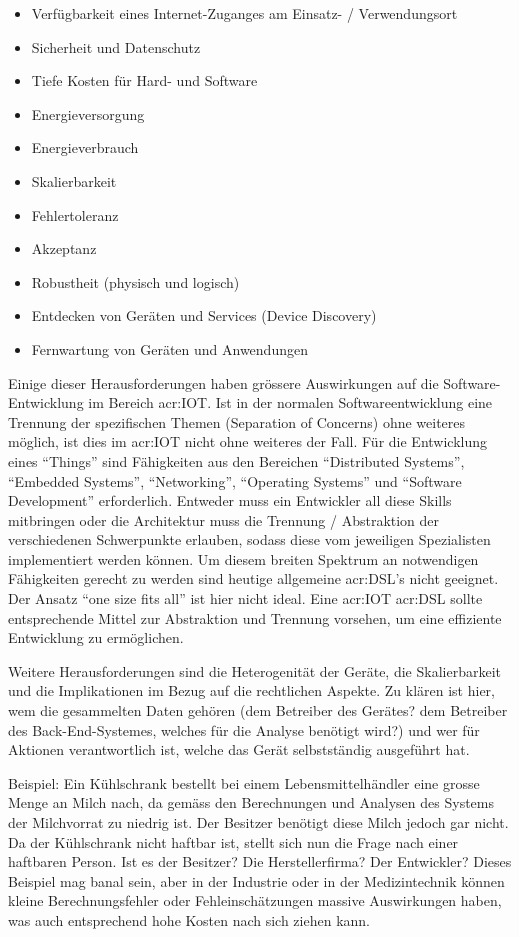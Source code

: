\begin{itemize}
\item Verfügbarkeit eines Internet-Zuganges am Einsatz- / Verwendungsort
\item Sicherheit und Datenschutz
\item Tiefe Kosten für Hard- und Software
\item Energieversorgung
\item Energieverbrauch
\item Skalierbarkeit
\item Fehlertoleranz
\item Akzeptanz
\item Robustheit (physisch und logisch)
\item Entdecken von Geräten und Services (Device Discovery)
\item Fernwartung von Geräten und Anwendungen
\end{itemize}

Einige dieser Herausforderungen haben grössere Auswirkungen auf die Software-Entwicklung im Bereich \gls{acr:IOT}. Ist in der normalen Softwareentwicklung eine Trennung der spezifischen Themen (Separation of Concerns) ohne weiteres möglich, ist dies im \gls{acr:IOT} nicht ohne weiteres der Fall. Für die Entwicklung eines "`Things"' sind Fähigkeiten aus den Bereichen "`Distributed Systems"', "`Embedded Systems"', "`Networking"', "`Operating Systems"' und "`Software Development"' erforderlich. Entweder muss ein Entwickler all diese Skills mitbringen oder die Architektur muss die Trennung / Abstraktion der verschiedenen Schwerpunkte erlauben, sodass diese vom jeweiligen Spezialisten implementiert werden können. Um diesem breiten Spektrum an notwendigen Fähigkeiten gerecht zu werden sind heutige allgemeine \gls{acr:DSL}'s nicht geeignet. Der Ansatz "`one size fits all"' ist hier nicht ideal. Eine \gls{acr:IOT} \gls{acr:DSL} sollte entsprechende Mittel zur Abstraktion und Trennung vorsehen, um eine effiziente Entwicklung zu ermöglichen. 

Weitere Herausforderungen sind die Heterogenität der Geräte, die Skalierbarkeit und die Implikationen im Bezug auf die rechtlichen Aspekte. Zu klären ist hier, wem die gesammelten Daten gehören (dem Betreiber des Gerätes? dem Betreiber des Back-End-Systemes, welches für die Analyse benötigt wird?) und wer für Aktionen verantwortlich ist, welche das Gerät selbstständig ausgeführt hat. 

Beispiel: Ein Kühlschrank bestellt bei einem Lebensmittelhändler eine grosse Menge an Milch nach, da gemäss den Berechnungen und Analysen des Systems der Milchvorrat zu niedrig ist. Der Besitzer benötigt diese Milch jedoch gar nicht. Da der Kühlschrank nicht haftbar ist, stellt sich nun die Frage nach einer haftbaren Person. Ist es der Besitzer? Die Herstellerfirma? Der Entwickler? Dieses Beispiel mag banal sein, aber in der Industrie oder in der Medizintechnik können kleine Berechnungsfehler oder Fehleinschätzungen massive Auswirkungen haben, was auch entsprechend hohe Kosten nach sich ziehen kann.




